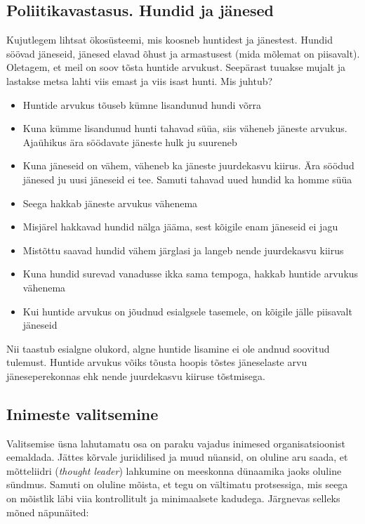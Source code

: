 \documentclass{article}
\begin{document}
\subsection{Poliitikavastasus. Hundid ja jänesed}
Kujutlegem lihtsat ökosüsteemi, mis koosneb huntidest ja jänestest. Hundid söövad jäneseid, jänesed elavad õhust ja armastusest (mida mõlemat on piisavalt). Oletagem, et meil on soov tõsta huntide arvukust. Seepärast tuuakse mujalt ja lastakse metsa lahti viis emast ja viis isast hunti. Mis juhtub? 
\begin{itemize}
	\item Huntide arvukus tõuseb kümne lisandunud hundi võrra
	\item Kuna kümme lisandunud hunti tahavad süüa, siis väheneb jäneste arvukus. Ajaühikus ära söödavate jäneste hulk ju suureneb
	\item Kuna jäneseid on vähem, väheneb ka jäneste juurdekasvu kiirus. Ära söödud jänesed ju uusi jäneseid ei tee. Samuti tahavad uued hundid ka homme süüa
	\item Seega hakkab jäneste arvukus vähenema
	\item Misjärel hakkavad hundid nälga jääma, sest kõigile enam jäneseid ei jagu
	\item Mistõttu saavad hundid vähem järglasi ja langeb nende juurdekasvu kiirus
	\item Kuna hundid surevad vanadusse ikka sama tempoga, hakkab huntide arvukus vähenema
	\item Kui huntide arvukus on jõudnud esialgsele tasemele, on kõigile jälle piisavalt jäneseid 
\end{itemize}

Nii taastub esialgne olukord, algne huntide lisamine ei ole andnud soovitud tulemust. Huntide arvukus võiks tõusta hoopis tõstes jäneselaste arvu jäneseperekonnas ehk nende juurdekasvu kiiruse tõstmisega. 

\subsection{Inimeste valitsemine}
Valitsemise üsna lahutamatu osa on paraku vajadus inimesed organisatsioonist eemaldada. Jättes kõrvale juriidilised ja muud nüansid, on oluline aru saada, et mõtteliidri (\emph{thought leader}) lahkumine on meeskonna dünaamika jaoks oluline sündmus. Samuti on oluline mõista, et tegu on vältimatu protsessiga, mis seega on mõistlik läbi viia kontrollitult ja minimaalsete kadudega. Järgnevas selleks mõned näpunäited: 
\end{document}
